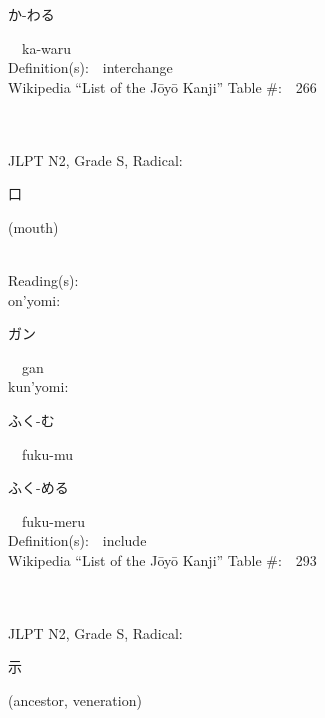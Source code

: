 \begin{multicols}{2}
{\hspace*{2em}}{\begin{CJK}{UTF8}{min} か-わる \end{CJK}}\ \ ka-waru\ \ \\
Definition(s):\ \ interchange \\
Wikipedia ``List of the J\=oy\=o Kanji'' Table \#:\ \ 266 \\
\ \ \\
{\fontsize{34pt}{40pt}  }\ \ \\  %
{JLPT N2, Grade S, Radical:\ \ {\begin{CJK}{UTF8}{min} 口 \end{CJK}} (mouth) } \\
Reading(s):\ \ \\
{\hspace*{1em}}on'yomi:\ \ \\
{\hspace*{2em}}{\begin{CJK}{UTF8}{min} ガン \end{CJK}}\ \ gan\ \ \\
{\hspace*{1em}}kun'yomi:\ \ \\
{\hspace*{2em}}{\begin{CJK}{UTF8}{min} ふく-む \end{CJK}}\ \ fuku-mu\ \ \\
{\hspace*{2em}}{\begin{CJK}{UTF8}{min} ふく-める \end{CJK}}\ \ fuku-meru\ \ \\
Definition(s):\ \ include \\
Wikipedia ``List of the J\=oy\=o Kanji'' Table \#:\ \ 293 \\
\ \ \\
{\fontsize{34pt}{40pt}  }\ \ \\  %
{JLPT N2, Grade S, Radical:\ \ {\begin{CJK}{UTF8}{min} 示 \end{CJK}} (ancestor, veneration) } \\

\end{multicols}
